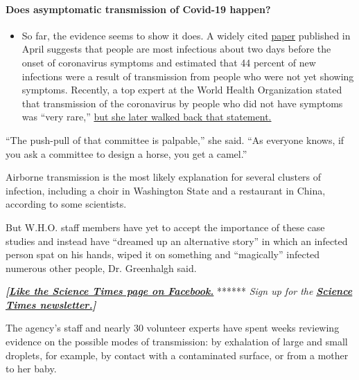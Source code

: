 \begin{itemize}
{  \paragraph{Does asymptomatic transmission of Covid-19
  happen?}\label{does-asymptomatic-transmission-of-covid-19-happen}}

  \begin{itemize}
  \tightlist
  \item
    So far, the evidence seems to show it does. A widely cited
    \href{https://www.nature.com/articles/s41591-020-0869-5}{paper}
    published in April suggests that people are most infectious about
    two days before the onset of coronavirus symptoms and estimated that
    44 percent of new infections were a result of transmission from
    people who were not yet showing symptoms. Recently, a top expert at
    the World Health Organization stated that transmission of the
    coronavirus by people who did not have symptoms was ``very rare,''
    \href{https://www.nytimes.com/2020/06/09/world/coronavirus-updates.html?action=click\&pgtype=Article\&state=default\&region=MAIN_CONTENT_3\&context=storylines_faq\#link-1f302e21}{but
    she later walked back that statement.}
  \end{itemize}
\end{itemize}

``The push-pull of that committee is palpable,'' she said. ``As everyone
knows, if you ask a committee to design a horse, you get a camel.''

Airborne transmission is the most likely explanation for several
clusters of infection, including a choir in Washington State and a
restaurant in China, according to some scientists.

But W.H.O. staff members have yet to accept the importance of these case
studies and instead have ``dreamed up an alternative story'' in which an
infected person spat on his hands, wiped it on something and
``magically'' infected numerous other people, Dr. Greenhalgh said.

\textbf{\emph{{[}}\href{http://on.fb.me/1paTQ1h}{\emph{Like the Science
Times page on Facebook.}}} ****** \emph{\textbar{} Sign up for the}
\textbf{\href{http://nyti.ms/1MbHaRU}{\emph{Science Times
newsletter.}}\emph{{]}}}

The agency's staff and nearly 30 volunteer experts have spent weeks
reviewing evidence on the possible modes of transmission: by exhalation
of large and small droplets, for example, by contact with a contaminated
surface, or from a mother to her baby.

